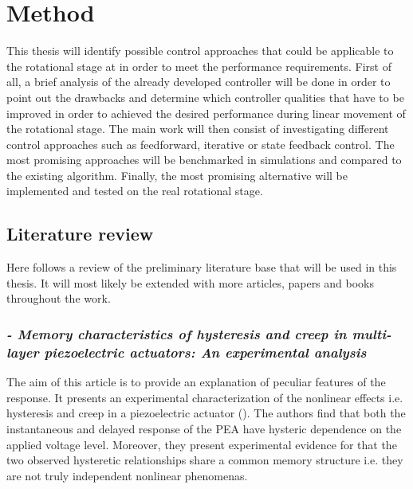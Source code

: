 \chapter{Method}\label{cha:metod}
This thesis will identify possible control approaches that could be applicable to the rotational stage at \abbrCERN in order to meet the performance requirements.
First of all, a brief analysis of the already developed controller will be done in order to point out the drawbacks and determine which controller qualities that have to be improved in order to achieved the desired performance during linear movement of the rotational stage. The main work will then consist of investigating different control approaches such as feedforward, iterative or state feedback control. The most promising approaches will be benchmarked in simulations and compared to the existing algorithm. Finally, the most promising alternative will be implemented and tested on the real rotational stage.

\section{Literature review}
Here follows a review of the preliminary literature base that will be used in this thesis. It will most likely be extended with more articles, papers and books throughout the work.

\subsection*{\citep*{Biggio:2014} {\small \emph{- Memory characteristics of hysteresis and creep in multi-layer piezoelectric actuators: An experimental analysis}}}
The aim of this article is to provide an explanation of peculiar features of the \abbrPEA response. It presents an experimental characterization of the nonlinear effects i.e. hysteresis and creep in a piezoelectric actuator (\abbrPEA). The authors find that both the instantaneous and delayed response of the PEA have hysteric dependence on the applied voltage level.
Moreover, they present experimental evidence for that the two observed hysteretic relationships share a common memory structure i.e. they are not truly independent nonlinear phenomenas.

